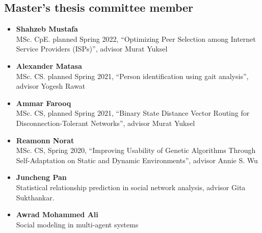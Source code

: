     
    \subsection*{Master's thesis committee member}
    

    \begin{itemize}


        \item \textbf{Shahzeb Mustafa}\\
        MSc. CpE. planned Spring 2022, ``Optimizing Peer Selection among Internet Service Providers (ISPs)'', advisor Murat Yuksel
        
        \item \textbf{Alexander Matasa}\\
        MSc. CS. planned Spring 2021, ``Person identification using gait analysis'', advisor Yogesh Rawat
        
        \item \textbf{Ammar Farooq}\\
        MSc. CS, planned Spring 2021, ``Binary State Distance Vector Routing for Disconnection-Tolerant Networks'', advisor Murat Yuksel
        
        \item \textbf{Reamonn Norat}\\
        MSc. CS, Spring 2020, ``Improving Usability of Genetic Algorithms Through Self-Adaptation on Static and Dynamic Environments'', advisor Annie S. Wu
        
        \item \textbf{Juncheng Pan}\\
        Statistical relationship prediction in social network analysis, advisor Gita Sukthankar.
        
        \item \textbf{Awrad Mohammed Ali}\\
        Social modeling in multi-agent systems
        
        

\end{itemize}
